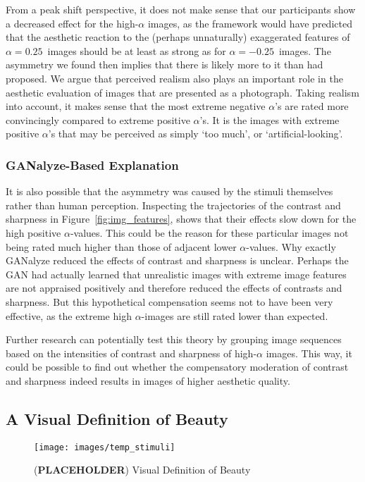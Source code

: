 \documentclass[../main.tex]{subfiles}
\begin{document}
From a peak shift perspective, it does not make sense that our participants show a decreased effect for the high-$\alpha$ images, as the framework would have predicted that the aesthetic reaction to the (perhaps unnaturally) exaggerated features of $\alpha=0.25$~images should be at least as strong as for $\alpha=-0.25$~images. The asymmetry we found then implies that there is likely more to it than \textcite{ramachandran1999science} had proposed. We argue that perceived realism also plays an important role in the aesthetic evaluation of images that are presented as a photograph. Taking realism into account, it makes sense that the most extreme negative $\alpha$'s are rated more convincingly compared to extreme positive $\alpha$'s. It is the images with extreme positive $\alpha$'s that may be perceived as simply `too much', or `artificial-looking'.

\subsubsection{GANalyze-Based Explanation}
It is also possible that the asymmetry was caused by the stimuli themselves rather than human perception. Inspecting the trajectories of the contrast and sharpness in Figure~\ref{fig:img_features}, shows that their effects slow down for the high positive $\alpha$-values. This could be the reason for these particular images not being rated much higher than those of adjacent lower $\alpha$-values. Why exactly GANalyze reduced the effects of contrast and sharpness is unclear. Perhaps the GAN had actually learned that unrealistic images with extreme image features are not appraised positively and therefore reduced the effects of contrasts and sharpness. But this hypothetical compensation seems not to have been very effective, as the extreme high $\alpha$-images are still rated lower than expected.

Further research can potentially test this theory by grouping image sequences based on the intensities of contrast and sharpness of high-$\alpha$ images. This way, it could be possible to find out whether the compensatory moderation of contrast and sharpness indeed results in images of higher aesthetic quality.



\subsection{A Visual Definition of Beauty}
\begin{figure}[!ht]
	\caption{(\textbf{PLACEHOLDER}) Visual Definition of Beauty}
	\label{img:visual_def}
	\texttt{[image: images/temp\_stimuli]}
\end{figure}
\end{document}
